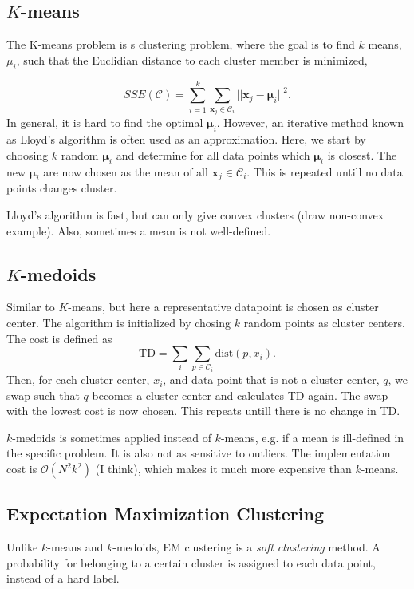 \documentclass[oneside]{memoir}
\renewcommand{\vec}[1]{\ensuremath{\bm{#1}}}
\begin{document}
\subsection{$K$-means}

The K-means problem is s clustering problem, where the goal is to find $k$ means, $\mu_i$, such that the Euclidian distance to each cluster member is minimized,

\begin{equation}
  \label{SSE k means}
SSE(\mathcal{C}) = \sum_{i=1}^k \sum_{\vec{x}_j\in \mathcal{C}_i} ||\vec{x}_j - \vec{\mu}_i||^2. 
\end{equation}
In general, it is hard to find the optimal $\vec{\mu}_i$. However, an iterative method known as Lloyd's algorithm is often used as an approximation. Here, we start by choosing $k$ random $\vec{\mu}_i$ and determine for all data points which $\vec{\mu}_i$ is closest. The new $\vec{\mu}_i$ are now chosen as the mean of all $\vec{x}_j \in \mathcal{C}_i$. This is repeated untill no data points changes cluster.

Lloyd's algorithm is fast, but can only give convex clusters (draw non-convex example). Also, sometimes a mean is not well-defined.

\subsection{$K$-medoids}

Similar to $K$-means, but here a representative datapoint is chosen as cluster center. The algorithm is initialized by chosing $k$ random points as cluster centers. The cost is defined as
\begin{equation}
  \label{kmedoid cost}
  \text{TD} = \sum_i \sum_{p\in \mathcal{C}_i} \text{dist} (p,x_i).
\end{equation}
Then, for each cluster center, $x_i$, and data point that is not a cluster center, $q$, we swap such that $q$ becomes a cluster center and calculates TD again. The swap with the lowest cost is now chosen. This repeats untill there is no change in TD.

$k$-medoids is sometimes applied instead of $k$-means, e.g. if a mean is ill-defined in the specific problem. It is also not as sensitive to outliers. The implementation cost is $\mathcal{O}(N^2k^2)$ (I think), which makes it much more expensive than $k$-means.

\subsection{Expectation Maximization Clustering}
Unlike $k$-means and $k$-medoids, EM clustering is a \emph{soft clustering} method. A probability for belonging to a certain cluster is assigned to each data point, instead of a hard label.
\end{document}
